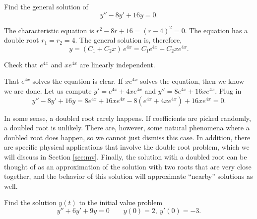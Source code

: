 
\begin{example}
Find the general solution of
\begin{equation*}
y'' -8 y' + 16 y = 0 .
\end{equation*}
\end{example}

\begin{exampleSol}
The characteristic equation is $r^2 - 8 r + 16 = {(r-4)}^2 = 0$.
The equation has a 
double root $r_1 = r_2 = 4$.  The general solution is, therefore,
\begin{equation*}
y = (C_1 + C_2 x)\, e^{4 x} = C_1 e^{4x} + C_2 x e^{4x} .
\end{equation*}

\begin{exercise}
Check that $e^{4x}$ and $x e^{4x}$ are linearly independent.
\end{exercise}

That $e^{4x}$ solves the equation is clear.  If $x e^{4x}$ solves the
equation, then we know we are done.  Let us compute
$y' = e^{4x} + 4xe^{4x}$ and
$y'' = 8 e^{4x} + 16xe^{4x}$.  Plug in
\begin{equation*}
y'' - 8 y' + 16 y = 
8 e^{4x} + 16xe^{4x} - 8(e^{4x} + 4xe^{4x}) + 16 xe^{4x} = 
0 .
\end{equation*}
\end{exampleSol}

In some sense, a doubled root rarely happens.  If coefficients are 
picked randomly, a doubled root is unlikely.
There are, however, some natural phenomena 
where a doubled root does happen, so we cannot just dismiss this case. In addition, there are specific physical applications that involve the double root problem, which we will discuss in Section \ref{sec:mv}. Finally, the solution with a doubled root can be thought of as an approximation of the solution with two roots that are very close together, and the behavior of this solution will approximate ``nearby'' solutions as well. 


\begin{example}
Find the solution $y(t)$ to the initial value problem
\begin{equation*}
y'' + 6y' + 9y = 0 \qquad y(0) = 2,\ y'(0) = -3.
\end{equation*}
\end{example}

